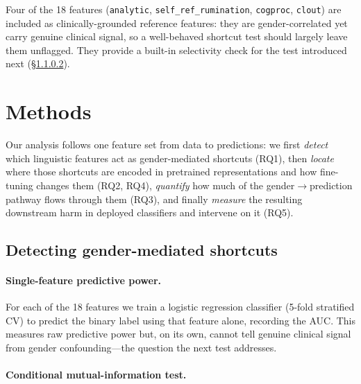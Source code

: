 \documentclass[11pt]{article}
\begin{document}
Four of the 18 features (\texttt{analytic}, \texttt{self\_ref\_rumination}, \texttt{cogproc}, \texttt{clout}) are included as clinically-grounded reference features: they are gender-correlated yet carry genuine clinical signal, so a well-behaved shortcut test should largely leave them unflagged. They provide a built-in selectivity check for the test introduced next (\S\ref{sec:mi-decomposition}).

\section{Methods}

Our analysis follows one feature set from data to predictions: we first \emph{detect} which linguistic features act as gender-mediated shortcuts (RQ1), then \emph{locate} where those shortcuts are encoded in pretrained representations and how fine-tuning changes them (RQ2, RQ4), \emph{quantify} how much of the gender$\to$prediction pathway flows through them (RQ3), and finally \emph{measure} the resulting downstream harm in deployed classifiers and intervene on it (RQ5).

\subsection{Detecting gender-mediated shortcuts}

\paragraph{Single-feature predictive power.}
For each of the 18 features we train a logistic regression classifier (5-fold stratified CV) to predict the binary label using that feature alone, recording the AUC. This measures raw predictive power but, on its own, cannot tell genuine clinical signal from gender confounding---the question the next test addresses.

\paragraph{Conditional mutual-information test.}
\label{sec:mi-decomposition}
\end{document}
